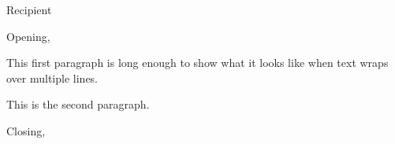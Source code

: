 \documentclass[a4paper]{letter}
\begin{document}
\begin{letter}{Recipient}
	\opening{Opening,}

	This first paragraph is long enough to show what it looks like
	when text wraps over multiple lines.

	This is the second paragraph.

	\closing{Closing,}
\end{letter}
\end{document}
